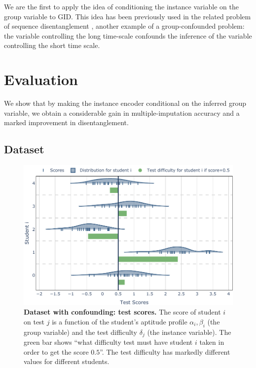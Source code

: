 \documentclass[nohyperref]{article}
\theoremstyle{plain}
\theoremstyle{definition}
\theoremstyle{remark}
\begin{document}
We are the first to apply the idea of conditioning the instance variable on the group variable to GID. This idea has been previously used in the related problem of sequence disentanglement \citep{Hsu2017UnsupervisedLO, Li2018DisentangledSA}, another example of a group-confounded problem: the variable controlling the long time-scale confounds the inference of the variable controlling the short time scale.

\section{Evaluation}

We show that by making the instance encoder conditional on the inferred group variable, we obtain a considerable gain in multiple-imputation accuracy and a marked improvement in disentanglement.

\subsection{Dataset}

\begin{figure}[t]
    \vskip 0.2in
    \begin{center}
    \centerline{\includegraphics[width=\columnwidth]{files/data.pdf}}
    \caption{\textbf{Dataset with confounding: test scores.} The score of student $i$ on test $j$ is a function of the student's aptitude profile $\alpha_i, \beta_i$ (the group variable) and the test difficulty $\delta_j$ (the instance variable). The green bar shows ``what difficulty test must have student $i$ taken in order to get the score $0.5$''. The test difficulty has markedly different values for different students.}
    \label{fig:data}
    \end{center}
    \vskip -0.2in
\end{figure}
\end{document}
